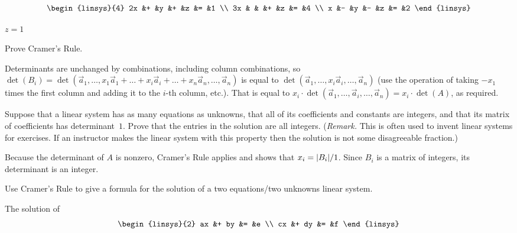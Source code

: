 \begin{exercises}
\begin{equation*}
\begin{linsys}{4}
        2x  &+  &y  &+  &z  &=  &1 \\
        3x  &   &   &+  &z  &=  &4 \\
         x  &-  &y  &-  &z  &=  &2
      \end{linsys}
    \end{equation*}
    \begin{answer}
      \( z=1 \)
    \end{answer}
  \item \label{ex:CramerRule}
    Prove Cramer's Rule.
    \begin{answer}
      Determinants are unchanged by combinations, 
      including column combinations, so
      \( \det(B_i)=\det(\vec{a}_1,\dots,
      x_1\vec{a}_1+\dots+x_i\vec{a}_i+\dots+x_n\vec{a}_n,\dots,\vec{a}_n) \)
      is equal to 
      $\det(\vec{a}_1,\dots,x_i\vec{a}_i,\dots,\vec{a}_n)$
      (use the operation of taking $-x_1$ times the first column and adding 
      it to the $i$-th column, etc.).  
      That is equal to 
      $x_i\cdot\det(\vec{a}_1,\dots,\vec{a}_i,\dots,\vec{a}_n)
         =x_i\cdot\det(A)$,
      as required.
    \end{answer}
  \item 
    Suppose that a linear system has as many equations as unknowns,
    that all of its coefficients and constants are integers, and that 
    its matrix
    of coefficients has determinant~\( 1 \).
    Prove that the entries in the solution are all integers.
    (\textit{Remark.}  
     This is often used to invent linear systems for exercises.
     If an instructor makes the linear system with this property
     then the solution is not some disagreeable fraction.)
    \begin{answer}
      Because the determinant of $A$ is nonzero, Cramer's Rule applies and
      shows that $x_i=\deter{B_i}/1$.  
      Since $B_i$ is a matrix of integers, its determinant is an integer.     
    \end{answer}
  \item 
    Use Cramer's Rule to give a formula for the solution of a
    two equations/two unknowns linear system.
    \begin{answer}
      The solution of
      \begin{equation*}
        \begin{linsys}{2}
           ax  &+  by  &=  &e  \\
           cx  &+  dy  &=  &f  
        \end{linsys}
      \end{equation*}

\end{answer}
\end{exercises}
